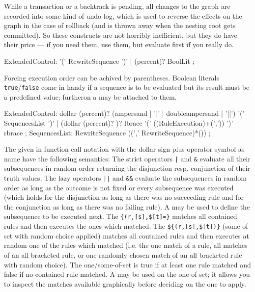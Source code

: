 \begin{note}
While a transaction or a backtrack is pending, all changes to the graph are recorded into some kind of undo log, which is used to reverse the effects on the graph in the case of rollback (and is thrown away when the nesting root gets committed).
So these constructs are not horribly inefficient, but they do have their price --- if you need them, use them, but evaluate first if you really do.
\end{note}

\begin{rail} 
  ExtendedControl: 
    '(' RewriteSequence ')' |
    (percent)? BoolLit
	;
\end{rail}

Forcing execution order can be achived by parentheses.
Boolean literals \texttt{true}/\texttt{false} come in handy if a sequence is to be evaluated 
but its result must be a predefined value; furtheron a  may be attached to them.

\begin{rail} 
  ExtendedControl: 
	dollar (percent)? (ampersand | '|' | doubleampersand | '||') '(' SequencesList ')' |
	(dollar (percent)? )? lbrace '(' ((RuleExecution)+(',')) ')' rbrace
	;
  SequencesList:
	RewriteSequence ((',' RewriteSequence)*())
	;
\end{rail}

The  given in function call notation with the dollar sign plus operator symbol as name have the following semantics:
The strict operators \verb/|/ and \verb/&/ evaluate all their subsequences in random order returning the disjunction resp. conjunction of their truth values.
The lazy operators \verb/||/ and \verb/&&/ evaluate the subsequences in random order as long as the outcome is not fixed or every subsequence was executed 
(which holds for the disjunction as long as there was no succeeding rule and for the conjunction as long as there was no failing rule).
A  may be used to define the subsequence to be executed next.
The  \verb/{(r,[s],$[t]=}/ matches all contained rules and then executes the ones which matched.
The  \verb/${(r,[s],$[t])}/ (some-of-set with random choice applied) matches all contained rules and then executes at random one of the rules which matched
(i.e. the one match of a rule, all matches of an all bracketed rule, or one randomly chosen match of an all bracketed rule with random choice).
The one/some-of-set is true if at least one rule matched and false if no contained rule matched.
A  may be used on the one-of-set; it allows you to inspect the matches available graphically before deciding on the one to apply. 

